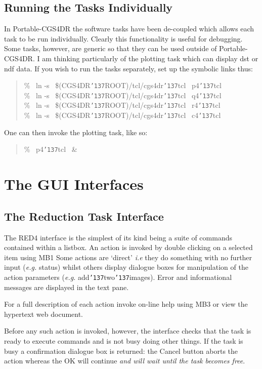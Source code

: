 \documentclass[a4paper]{book}
\newcommand{\stardocinitials}  {SUN}
\newcommand{\stardocnumber}    {27.5}
\newcommand{\stardocname}{\stardocinitials /\stardocnumber}
\renewcommand{\_}{{\tt\char'137}}
\begin{document}
\section{Running the Tasks Individually}
In Portable-CGS4DR the software tasks have been de-coupled which allows each task to be
run individually. Clearly this functionality is useful for debugging. Some tasks, however,
are generic so that they can be used outside of Portable-CGS4DR. I am thinking particularly
of the plotting task which can display {\sc dst} or {\sc ndf} data. If you wish to run the
tasks separately, set up the symbolic links thus:

\begin{quote}
  \% \ ln -s \ \$(CGS4DR\_ROOT)/tcl/cgs4dr\_tcl \ p4\_tcl \\
  \% \ ln -s \ \$(CGS4DR\_ROOT)/tcl/cgs4dr\_tcl \ q4\_tcl \\
  \% \ ln -s \ \$(CGS4DR\_ROOT)/tcl/cgs4dr\_tcl \ r4\_tcl \\
  \% \ ln -s \ \$(CGS4DR\_ROOT)/tcl/cgs4dr\_tcl \ c4\_tcl 
\end{quote}

One can then invoke the plotting task, like so:

\begin{quote}
  \% \ p4\_tcl \ \&
\end{quote}

\markboth{The GUI Interfaces}{\stardocname}
\chapter{The GUI Interfaces}
\section{The Reduction Task Interface}
The RED4 interface is the simplest of its kind being a suite of commands 
contained within a listbox. An action is invoked by double clicking on a selected item using MB1
Some actions are `direct' {\em i.e} they do something with no further
input ({\em e.g.} status) whilst others display dialogue boxes for manipulation of the action
parameters ({\em e.g.} add\_two\_images). Error and informational messages are displayed in the text pane.

For a full description of each action invoke on-line help using MB3 or view the hypertext web document.

Before any such action is invoked, however, the interface checks that the task is
ready to execute commands and is not busy doing other things. If the task is busy a confirmation 
dialogue box is returned: the {\sf Cancel} button aborts the action whereas the {\sf OK} will continue 
{\em and will wait until the task becomes free}.
\end{document}
